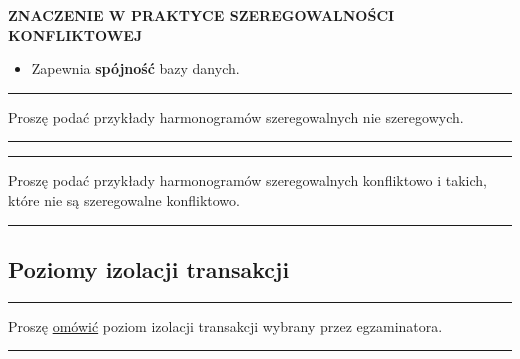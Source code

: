 \documentclass[a5paper,6pt]{article}
\newcommand{\horrule}[1]{\rule{\linewidth}{#1}}
\begin{document}
    \textbf{ZNACZENIE W PRAKTYCE SZEREGOWALNOŚCI KONFLIKTOWEJ}
    \begin{itemize}
        \item Zapewnia \textbf{spójność} bazy danych.
    \end{itemize}

    \horrule{0.5pt}
    Proszę podać przykłady harmonogramów szeregowalnych nie szeregowych.\\
    \horrule{0.5pt}

    \horrule{0.5pt}
    Proszę podać przykłady harmonogramów szeregowalnych konfliktowo i takich,
    które nie są szeregowalne konfliktowo.\\
    \horrule{0.5pt}


\pagebreak
    \subsection{Poziomy izolacji transakcji} %
    \label{sub:poziomy_izolacji_transakcji}

    \horrule{0.5pt}
    Proszę \underline{omówić} poziom izolacji transakcji wybrany przez
    egzaminatora.\\
    \horrule{0.5pt}

    \vskip 1cm
\end{document}
